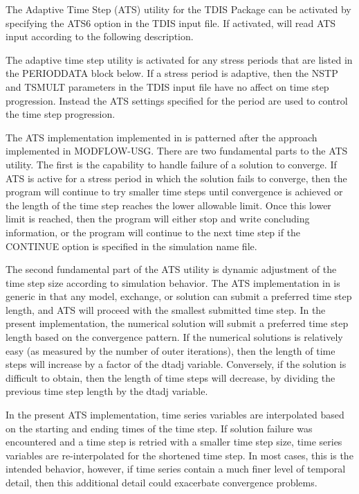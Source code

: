 The Adaptive Time Step (ATS) utility for the TDIS Package can be activated by specifying the ATS6 option in the TDIS input file.  If activated, \mf will read ATS input according to the following description.

The adaptive time step utility is activated for any stress periods that are listed in the PERIODDATA block below.  If a stress period is adaptive, then the NSTP and TSMULT parameters in the TDIS input file have no affect on time step progression.  Instead the ATS settings specified for the period are used to control the time step progression.

The ATS implementation implemented in \mf is patterned after the approach implemented in MODFLOW-USG.  There are two fundamental parts to the ATS utility.  The first is the capability to handle failure of a solution to converge.  If ATS is active for a stress period in which the solution fails to converge, then the program will continue to try smaller time steps until convergence is achieved or the length of the time step reaches the lower allowable limit.  Once this lower limit is reached, then the program will either stop and write concluding information, or the program will continue to the next time step if the CONTINUE option is specified in the simulation name file.  

The second fundamental part of the ATS utility is dynamic adjustment of the time step size according to simulation behavior.  The ATS implementation in \mf is generic in that any model, exchange, or solution can submit a preferred time step length, and ATS will proceed with the smallest submitted time step.  In the present implementation, the numerical solution will submit a preferred time step length based on the convergence pattern.  If the numerical solutions is relatively easy (as measured by the number of outer iterations), then the length of time steps will increase by a factor of the dtadj variable.  Conversely, if the solution is difficult to obtain, then the length of time steps will decrease, by dividing the previous time step length by the dtadj variable.  

In the present ATS implementation, time series variables are interpolated based on the starting and ending times of the time step.  If solution failure was encountered and a time step is retried with a smaller time step size, time series variables are re-interpolated for the shortened time step.  In most cases, this is the intended behavior, however, if time series contain a much finer level of temporal detail, then this additional detail could exacerbate convergence problems.

